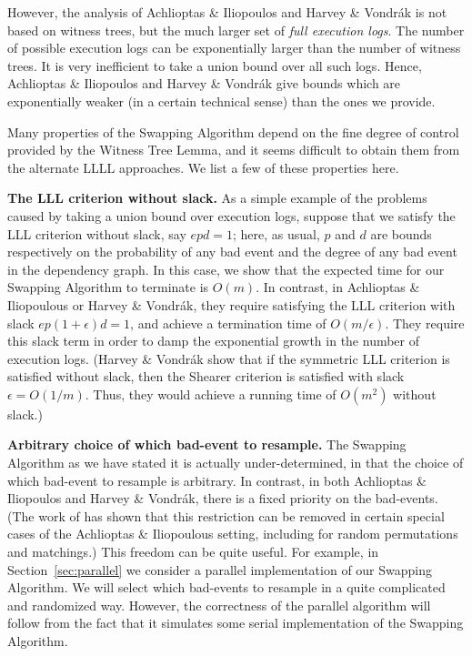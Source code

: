 However, the analysis of Achlioptas \& Iliopoulos and Harvey \& Vondr\'{a}k is not based on witness trees, but the much larger set of \emph{full execution logs}. The number of possible execution logs can be exponentially larger than the number of witness trees. It is very inefficient to take a union bound over all such logs. Hence, Achlioptas \& Iliopoulos and Harvey \& Vondr\'{a}k give bounds which are exponentially weaker (in a certain technical sense) than the ones we provide. 

Many properties of the Swapping Algorithm depend on the fine degree of control provided by the Witness Tree Lemma, and it seems difficult to obtain them from the alternate LLLL approaches. We list a few of these properties here.

\textbf{The LLL criterion without slack.} As a simple example of the problems caused by taking a union bound over execution logs, suppose that we satisfy the LLL criterion without slack, say $e p d = 1$; here, as usual, $p$ and $d$ are bounds respectively on the probability of any bad event and the degree of any bad event in the dependency graph. In this case, we show that the expected time for our Swapping Algorithm to terminate is $O(m)$. In contrast, in Achlioptas \& Iliopoulous or Harvey \& Vondr\'{a}k, they require satisfying the LLL criterion with slack $e p (1+\epsilon) d = 1$, and achieve a termination time of $O(m/\epsilon)$. They require this slack term in order to damp the exponential growth in the number of execution logs. (Harvey \& Vondr\'{a}k show that if the symmetric LLL criterion is satisfied without slack, then the Shearer criterion \cite{shearer:lll} is satisfied with slack $\epsilon = O(1/m)$. Thus, they would achieve a running time of $O(m^2)$ without slack.)

\textbf{Arbitrary choice of which bad-event to resample.} The Swapping Algorithm as we have stated it is actually under-determined, in that the choice of which bad-event to resample is arbitrary. In contrast, in both Achlioptas \& Iliopoulos and Harvey \& Vondr\'{a}k, there is a fixed priority on the bad-events. (The work of \cite{kolmogorov} has shown that this restriction can be removed in certain special cases of the Achlioptas \& Iliopoulous setting, including for random permutations and matchings.)  This freedom can be quite useful. For example, in Section~\ref{sec:parallel} we consider a parallel implementation of our Swapping Algorithm. We will select which bad-events to resample in a quite complicated and randomized way. However, the correctness of the parallel algorithm will follow from the fact that it simulates some serial implementation of the Swapping Algorithm.

